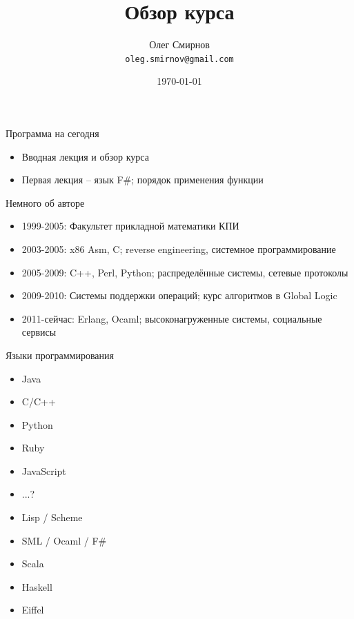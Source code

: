 \documentclass{beamer}
\title[Введение в функциональное программирование]{Обзор курса}
\author{Олег Смирнов\\
\texttt{oleg.smirnov@gmail.com}}
\institute{УНК ``ИПСА'' НТУУ ``КПИ''}
\date{\today}
\begin{document}
\begin{frame}
\titlepage
\end{frame}

\begin{frame}{Программа на сегодня}
  \begin{itemize}
    \item Вводная лекция и обзор курса
    \item Первая лекция -- язык F\#; порядок применения функции
  \end{itemize}
\end{frame}

\begin{frame}{Немного об авторе}
  \begin{itemize}
  \item 1999-2005: Факультет прикладной математики КПИ
  \item 2003-2005: x86 Asm, C; reverse engineering, системное программирование
  \item 2005-2009: C++, Perl, Python; распределённые системы, сетевые протоколы
  \item 2009-2010: Системы поддержки операций; курс алгоритмов в Global Logic
  \item 2011-сейчас: Erlang, Ocaml; высоконагруженные системы, социальные сервисы
  \end{itemize}
\end{frame}

\begin{frame}{Языки программирования}
  \begin{minipage}{0.49\linewidth}
    \begin{itemize}
    \item Java
    \item C/C++
    \item Python
    \item Ruby
    \item JavaScript
    \item ...?
    \end{itemize}
  \end{minipage}
  \begin{minipage}{0.49\linewidth}
    \begin{itemize}
    \item Lisp / Scheme
    \item SML / Ocaml / F\#
    \item Scala
    \item Haskell
    \item Eiffel
    \end{itemize}
  \end{minipage}
\end{frame}
\end{document}
